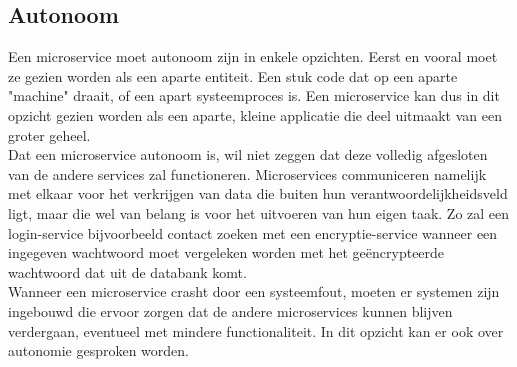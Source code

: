\documentclass[pdftex,a4paper,12pt,twoside]{report}
\begin{document}
\subsection{Autonoom}
\label{subsec:autonoom}
Een microservice moet  autonoom zijn in enkele opzichten. Eerst en vooral moet ze gezien worden als een aparte entiteit. Een stuk code dat op een aparte "machine" draait, of een apart systeemproces is. Een microservice kan dus in dit opzicht gezien worden als een aparte, kleine applicatie die deel uitmaakt van een groter geheel.
\\
Dat een microservice autonoom is, wil niet zeggen dat deze volledig afgesloten van de andere services zal functioneren. Microservices communiceren namelijk met elkaar voor het verkrijgen van data die buiten hun verantwoordelijkheidsveld ligt, maar die wel van belang is voor het uitvoeren van hun eigen taak. Zo zal een login-service bijvoorbeeld contact zoeken met een encryptie-service wanneer een ingegeven wachtwoord moet vergeleken worden met het geëncrypteerde wachtwoord dat uit de databank komt.
\\
Wanneer een microservice crasht door een systeemfout, moeten er systemen zijn ingebouwd die ervoor zorgen dat de andere microservices kunnen blijven verdergaan, eventueel met mindere functionaliteit. In dit opzicht kan er ook over autonomie gesproken worden.
\newpage
\end{document}
